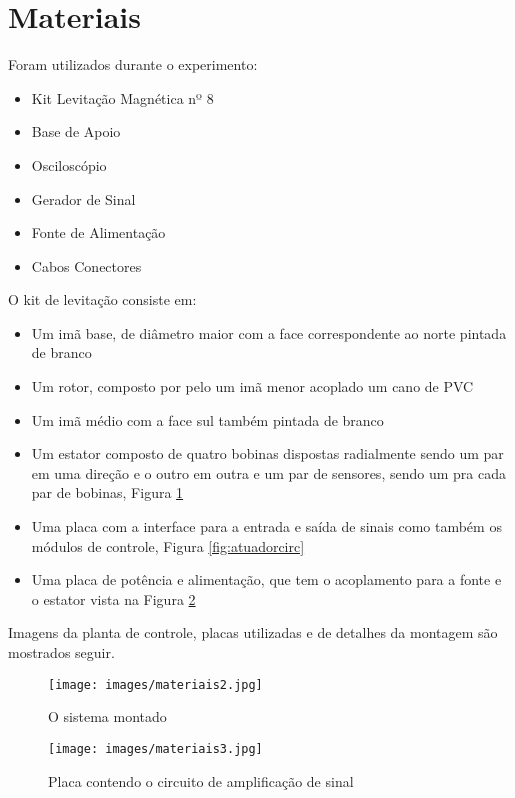 \section{Materiais}
Foram utilizados durante o experimento:

\begin{itemize}
	\item Kit Levitação Magnética nº 8
	\item Base de Apoio
    \item Osciloscópio
    \item Gerador de Sinal
    \item Fonte de Alimentação
    \item Cabos Conectores
\end{itemize}

O kit de levitação consiste em:

\begin{itemize}
	\item Um imã base, de diâmetro maior com a face correspondente ao norte pintada de branco
	\item Um rotor, composto por pelo um imã menor acoplado um cano de PVC
    \item Um imã médio com a face sul também pintada de branco
    \item Um estator composto de quatro bobinas dispostas radialmente sendo um par em uma direção e o outro em outra e um par de sensores, sendo um pra cada par de bobinas, Figura \ref{fig:materiais-placa1}
    \item Uma placa com a interface para a entrada e saída de sinais como também os módulos de controle, Figura \ref{fig:atuadorcirc}
    \item Uma placa de  potência e alimentação, que tem o acoplamento para a fonte e o estator vista na Figura \ref{fig:materiais-pote}
\end{itemize}

Imagens da planta de controle, placas utilizadas e de detalhes da montagem são mostrados seguir.

\begin{figure}[H]
\centering
\texttt{[image: images/materiais2.jpg]}
\caption{O sistema montado}
\label{fig:materiais-placa1}
\end{figure}

\begin{figure}[H]
\centering
\texttt{[image: images/materiais3.jpg]}
\caption{Placa contendo o circuito de amplificação de sinal}
\label{fig:materiais-pote}
\end{figure}

